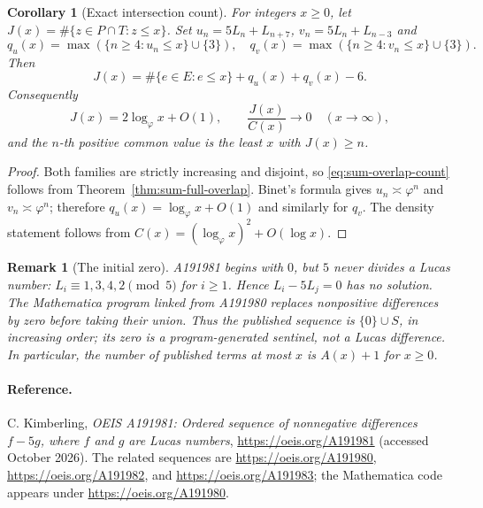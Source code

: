 \documentclass[11pt]{article}
\newtheorem{corollary}[theorem]{Corollary}
\newtheorem{remark}[theorem]{Remark}
\begin{document}
\begin{corollary}[Exact intersection count]\label{cor:sum-overlap-count}
For integers $x\ge0$, let $J(x)=\#\{z\in P\cap T:z\le x\}$.
Set $u_n=5L_n+L_{n+7}$, $v_n=5L_n+L_{n-3}$ and
\[
q_u(x)=\max(\{n\ge4:u_n\le x\}\cup\{3\}),\quad
q_v(x)=\max(\{n\ge4:v_n\le x\}\cup\{3\}).
\]
Then
\begin{equation}\label{eq:sum-overlap-count}
\boxed{\displaystyle J(x)=\#\{e\in E:e\le x\}
       +q_u(x)+q_v(x)-6.}
\end{equation}
Consequently
\[
J(x)=2\log_\varphi x+O(1),\qquad
\frac{J(x)}{C(x)}\longrightarrow0\quad(x\to\infty),
\]
and the $n$-th positive common value is the least $x$
with $J(x)\ge n$.
\end{corollary}
\begin{proof}
Both families are strictly increasing and disjoint,
so \eqref{eq:sum-overlap-count} follows from
Theorem~\ref{thm:sum-full-overlap}.
Binet's formula gives $u_n\asymp\varphi^n$ and
$v_n\asymp\varphi^n$; therefore
$q_u(x)=\log_\varphi x+O(1)$ and similarly for $q_v$.
The density statement follows from
$C(x)=(\log_\varphi x)^2+O(\log x)$.
\end{proof}

\begin{remark}[The initial zero]
A191981 begins with $0$, but $5$ never divides a Lucas number: $L_i\equiv1,3,4,2\pmod5$ for $i\ge1$. Hence $L_i-5L_j=0$ has no solution. The Mathematica program linked from A191980 replaces nonpositive differences by zero before taking their union. Thus the published sequence is $\{0\}\cup S$, in increasing order; its zero is a program-generated sentinel, not a Lucas difference. In particular, the number of published terms at most $x$ is $A(x)+1$ for $x\ge0$.
\end{remark}

\paragraph{Reference.}
C. Kimberling, \emph{OEIS A191981: Ordered sequence of nonnegative differences $f-5g$, where $f$ and $g$ are Lucas numbers}, \url{https://oeis.org/A191981} (accessed October 2026). The related sequences are \url{https://oeis.org/A191980}, \url{https://oeis.org/A191982}, and \url{https://oeis.org/A191983}; the Mathematica code appears under \url{https://oeis.org/A191980}.
\end{document}
